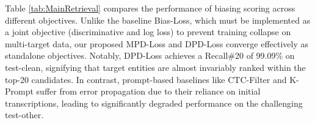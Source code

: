 \documentclass[cameraready]{Interspeech}
\begin{document}
%
Table \ref{tab:MainRetrieval} compares the performance of biasing scoring across different objectives.
%
Unlike the baseline Bias-Loss, which must be implemented as a joint objective (discriminative and log loss) \cite{huang2025neuralmodelcontextualbiasing} to prevent training collapse on multi-target data, our proposed MPD-Loss and DPD-Loss converge effectively as standalone objectives.
%
Notably, DPD-Loss achieves a Recall\#20 of 99.09\% on test-clean, signifying that target entities are almost invariably ranked within the top-20 candidates.
%
In contrast, prompt-based baselines like CTC-Filter and K-Prompt suffer from error propagation due to their reliance on initial transcriptions, leading to significantly degraded performance on the challenging test-other.


\begin{table}[htbp]
    \caption{B-WER (WER/U-WER) performance of COALA and baselines across various biasing list sizes ($N$). Results for the baselines are from their original reports. w/o Biasing represents performance without biasing list information. OOM (out-of-memory) indicates that the required inference VRAM exceeded 24 GB, and BTI is the biasing target identification.}
    \label{tab:MainASR}
    \centering
\end{table}
\end{document}

